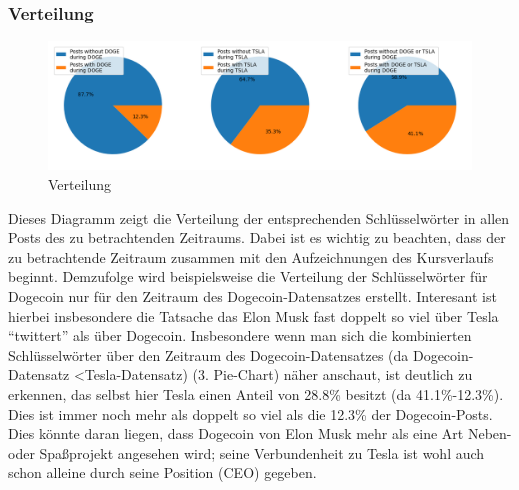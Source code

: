 \documentclass{article}
\begin{document}
\subsubsection{Verteilung}
\begin{figure}[h]
  	\centering
  	\includegraphics[width=\textwidth]{../imgs/Verteilung.png}
 	\caption{Verteilung}
 	\label{fig:Verteilung}
\end{figure}
Dieses Diagramm zeigt die Verteilung der entsprechenden Schlüsselwörter in allen Posts des zu betrachtenden Zeitraums.
Dabei ist es wichtig zu beachten, dass der zu betrachtende Zeitraum zusammen mit den Aufzeichnungen des Kursverlaufs beginnt.
Demzufolge wird beispielsweise die Verteilung der Schlüsselwörter für Dogecoin nur für den Zeitraum des Dogecoin-Datensatzes erstellt.
Interesant ist hierbei insbesondere die Tatsache das Elon Musk fast doppelt so viel über Tesla ``twittert'' als über Dogecoin.
Insbesondere wenn man sich die kombinierten Schlüsselwörter über den Zeitraum des Dogecoin-Datensatzes (da Dogecoin-Datensatz \textless Tesla-Datensatz) (3. Pie-Chart) näher anschaut, ist deutlich zu erkennen, das selbst hier Tesla einen Anteil von 28.8\% besitzt (da 41.1\%-12.3\%).
Dies ist immer noch mehr als doppelt so viel als die 12.3\% der Dogecoin-Posts.
Dies könnte daran liegen, dass Dogecoin von Elon Musk mehr als eine Art Neben- oder Spaßprojekt angesehen wird; seine Verbundenheit zu Tesla ist wohl auch schon alleine durch seine Position (CEO) gegeben.
\end{document}
